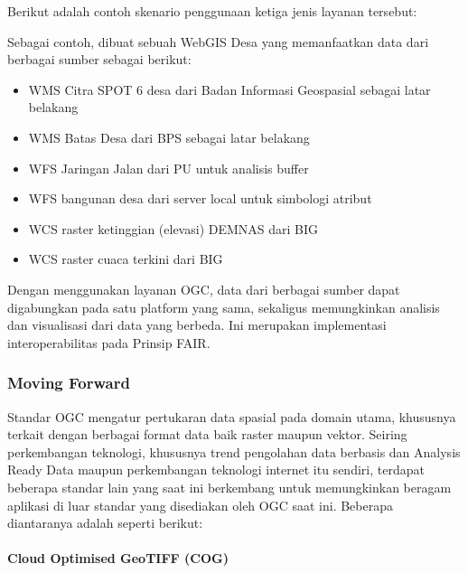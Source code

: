\documentclass[letterpaper,10pt,english]{sphinxmanual}
\begin{document}
Berikut adalah contoh skenario penggunaan ketiga jenis layanan tersebut:

Sebagai contoh, dibuat sebuah WebGIS Desa yang memanfaatkan data dari berbagai sumber sebagai berikut:
\begin{itemize}
\item {} 
WMS Citra SPOT 6 desa dari Badan Informasi Geospasial sebagai latar belakang

\item {} 
WMS Batas Desa dari BPS sebagai latar belakang

\item {} 
WFS Jaringan Jalan dari PU untuk analisis buffer

\item {} 
WFS bangunan desa dari server local untuk simbologi atribut

\item {} 
WCS raster ketinggian (elevasi) DEMNAS dari BIG

\item {} 
WCS raster cuaca terkini dari BIG

\end{itemize}

Dengan menggunakan layanan OGC, data dari berbagai sumber dapat digabungkan pada satu platform yang sama, sekaligus memungkinkan analisis dan visualisasi dari data yang berbeda. Ini merupakan implementasi interoperabilitas pada Prinsip FAIR.


\subsubsection{Moving Forward}
\label{\detokenize{sesi3/interoperabilitas:moving-forward}}
Standar OGC mengatur pertukaran data spasial pada domain utama, khususnya terkait dengan berbagai format data baik raster maupun vektor. Seiring perkembangan teknologi, khususnya trend pengolahan data berbasis  dan Analysis Ready Data maupun perkembangan teknologi internet itu sendiri, terdapat beberapa standar lain yang saat ini berkembang untuk memungkinkan beragam aplikasi di luar standar yang disediakan oleh OGC saat ini. Beberapa diantaranya adalah seperti berikut:


\paragraph{Cloud Optimised GeoTIFF (COG)}
\label{\detokenize{sesi3/interoperabilitas:cloud-optimised-geotiff-cog}}
\end{document}
